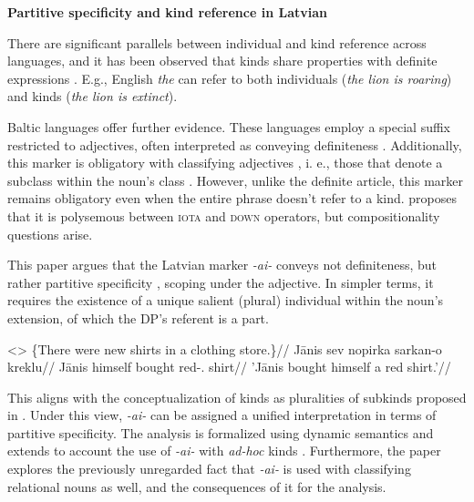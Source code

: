 \documentclass[a4paper, 12pt]{article}
\begin{document}
\begin{sloppypar}


\textbf{Partitive specificity and kind reference in Latvian}

There are significant parallels between individual and kind reference across languages, and it has been observed that kinds share properties with definite expressions \parencite[a.m.o.]{carlson1977referencekindsenglish, chierchia1998referencekindslanguages, krifka1995genericityintroduction}. E.g., English \textit{the} can refer to both individuals (\textit{the lion is roaring}) and kinds (\textit{the lion is extinct}).

Baltic languages offer further evidence. These languages employ a special suffix restricted to adjectives, often interpreted as conveying definiteness \parencite[160]{sereikaite2019strongvsweak,holvoet2012semanticmapdefinite,kalnaca2021latviangrammar}. Additionally, this marker is obligatory with classifying adjectives \parencite{rutkowski2006classifyingadjectivesnoun}, i. e., those that denote a subclass within the noun's class \parencite{mcnally2004relationaladjectivesproperties}. However, unlike the definite article, this marker remains obligatory even when the entire phrase doesn't refer to a kind. \parencite{sereikaite2017kindreferencedps} proposes that it is polysemous between \textsc{iota} and \textsc{down} operators, but compositionality questions arise.

This paper argues that the Latvian marker \textit{-ai-} conveys not definiteness, but rather partitive specificity \parencite{enc1991semanticsspecificity}, scoping under the adjective. In simpler terms, it requires the existence of a unique salient (plural) individual within the noun's extension, of which the DP's referent is a part.

\ex<>
    \begingl
        \glpreamble \{There were new shirts in a clothing store.\}//
        \gla Jānis sev nopirka sarkan-o kreklu//
        \glb Jānis himself bought red-\Def{}.\Acc{} shirt//
        \glft 'Jānis bought himself a red shirt.'//
    \endgl
\xe

This aligns with the conceptualization of kinds as pluralities of subkinds proposed in \parencite{krifka1995genericityintroduction}. Under this view, \textit{-ai-} can be assigned a unified interpretation in terms of partitive specificity. The analysis is formalized using dynamic semantics \parencite{heim1982semanticsdefiniteindefinite,dekker1996valuesvariablesdynamic} and extends to account the use of \textit{-ai-} with \textit{ad-hoc} kinds \parencite[82]{mendia2019referenceadhoc,holvoet2012semanticmapdefinite}. Furthermore, the paper explores the previously unregarded fact that \textit{-ai-} is used with classifying relational nouns as well, and the consequences of it for the analysis.

% 
\printbibliography

\end{sloppypar}
\end{document}
